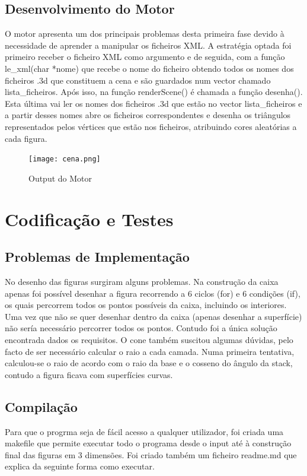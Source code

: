 \documentclass{report}
\begin{document}
\section{Desenvolvimento do Motor}
O motor apresenta um dos principais problemas desta primeira fase devido \`a necessidade de aprender a manipular os ficheiros XML.
A estrat\'egia optada foi primeiro receber o ficheiro XML como argumento e de seguida, com a função le\_xml(char *nome) que recebe o nome do ficheiro obtendo todos os nomes dos ficheiros .3d que constituem a cena e s\~ao guardados num vector chamado lista\_ficheiros.    
Ap\'os isso, na função renderScene() \'e chamada a fun\c{c}\~ao desenha(). Esta \'ultima vai ler os nomes dos ficheiros .3d que est\~ao no vector lista\_ficheiros e a partir desses nomes abre os ficheiros correspondentes e desenha os tri\^angulos representados pelos v\'ertices que est\~ao nos ficheiros, atribuindo cores aleat\'orias a cada figura. \newline

\begin{figure}[h]
\centering
\texttt{[image: cena.png]}
\caption{Output do Motor}
\end{figure}

\chapter{Codifica\c{c}\~{a}o e Testes} %
\section{Problemas de Implementa\c{c}\~{a}o}
No desenho das figuras surgiram alguns problemas. 
Na constru\c{c}\~ao da caixa apenas foi poss\'ivel desenhar a figura recorrendo a 6 ciclos (for) e 6 condi\c{c}\~oes (if), os quais percorrem todos os pontos poss\'iveis da caixa, incluindo os interiores. Uma vez que n\~ao se quer desenhar dentro da caixa (apenas desenhar a superf\'icie) n\~ao ser\'ia necess\'ario percorrer todos os pontos. Contudo foi a \'unica solu\c{c}\~ao encontrada dados os requisitos.
O cone tamb\'em suscitou algumas d\'uvidas, pelo facto de ser necess\'ario calcular o raio a cada camada. Numa primeira tentativa, calculou-se o raio de acordo com o raio da base e o cosseno do \^angulo da stack, contudo a figura ficava com superf\'icies curvas. 
\clearpage
\section{Compila\c{c}\~ao}
Para que o progrma seja de f\'acil acesso a qualquer utilizador, foi criada uma makefile que permite executar todo o programa desde o input at\'e \`a constru\c{c}\~ao final das figuras em 3 dimens\~oes. Foi criado tamb\'em um ficheiro readme.md que explica da seguinte forma como executar.
\end{document}

